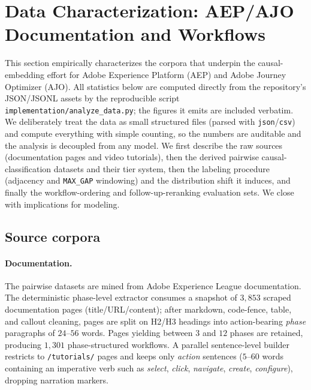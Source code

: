 \section{Data Characterization: AEP/AJO Documentation and Workflows}
\label{sec:data}

This section empirically characterizes the corpora that underpin the causal-embedding
effort for Adobe Experience Platform (AEP) and Adobe Journey Optimizer (AJO). All
statistics below are computed directly from the repository's JSON/JSONL assets by the
reproducible script \texttt{implementation/analyze\_data.py}; the figures it emits are
included verbatim. We deliberately treat the data as small structured files (parsed with
\texttt{json}/\texttt{csv}) and compute everything with simple counting, so the numbers
are auditable and the analysis is decoupled from any model. We first describe the raw
sources (documentation pages and video tutorials), then the derived pairwise
causal-classification datasets and their tier system, then the labeling procedure
(adjacency and \texttt{MAX\_GAP} windowing) and the distribution shift it induces, and
finally the workflow-ordering and follow-up-reranking evaluation sets. We close with
implications for modeling.

\subsection{Source corpora}

\paragraph{Documentation.} The pairwise datasets are mined from Adobe Experience League
documentation. The deterministic phase-level extractor consumes a snapshot of $3{,}853$
scraped documentation pages (title/URL/content); after markdown, code-fence, table, and
callout cleaning, pages are split on H2/H3 headings into action-bearing
\emph{phase} paragraphs of $24$--$56$ words. Pages yielding between $3$ and $12$ phases
are retained, producing $1{,}301$ phase-structured workflows. A parallel sentence-level
builder restricts to \texttt{/tutorials/} pages and keeps only \emph{action} sentences
($5$--$60$ words containing an imperative verb such as \emph{select}, \emph{click},
\emph{navigate}, \emph{create}, \emph{configure}), dropping narration markers.

